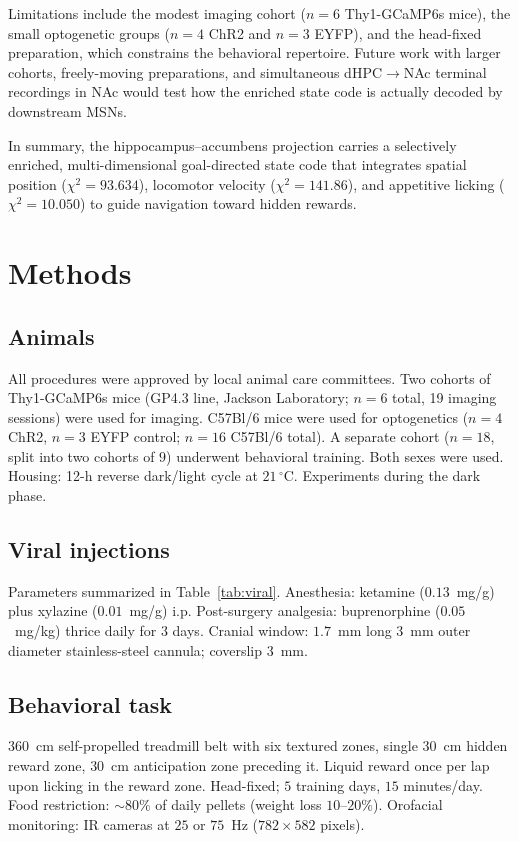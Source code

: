 \documentclass[11pt]{article}
\begin{document}
Limitations include the modest imaging cohort ($n=6$ Thy1-GCaMP6s mice), the small optogenetic groups ($n=4$ ChR2 and $n=3$ EYFP), and the head-fixed preparation, which constrains the behavioral repertoire. Future work with larger cohorts, freely-moving preparations, and simultaneous dHPC$\to$NAc terminal recordings in NAc would test how the enriched state code is actually decoded by downstream MSNs.

In summary, the hippocampus--accumbens projection carries a selectively enriched, multi-dimensional goal-directed state code that integrates spatial position ($\chi^2 = 93.634$), locomotor velocity ($\chi^2 = 141.86$), and appetitive licking ($\chi^2 = 10.050$) to guide navigation toward hidden rewards.

\section{Methods}

\subsection{Animals}
All procedures were approved by local animal care committees. Two cohorts of Thy1-GCaMP6s mice (GP4.3 line, Jackson Laboratory; $n=6$ total, 19 imaging sessions) were used for imaging. C57Bl/6 mice were used for optogenetics ($n=4$ ChR2, $n=3$ EYFP control; $n=16$ C57Bl/6 total). A separate cohort ($n=18$, split into two cohorts of $9$) underwent behavioral training. Both sexes were used. Housing: 12-h reverse dark/light cycle at $21\,^\circ$C. Experiments during the dark phase.

\subsection{Viral injections}
Parameters summarized in Table~\ref{tab:viral}. Anesthesia: ketamine ($0.13$~mg/g) plus xylazine ($0.01$~mg/g) i.p. Post-surgery analgesia: buprenorphine ($0.05$~mg/kg) thrice daily for 3 days. Cranial window: $1.7$~mm long $3$~mm outer diameter stainless-steel cannula; coverslip $3$~mm.

\subsection{Behavioral task}
$360$~cm self-propelled treadmill belt with six textured zones, single $30$~cm hidden reward zone, $30$~cm anticipation zone preceding it. Liquid reward once per lap upon licking in the reward zone. Head-fixed; $5$ training days, $15$ minutes/day. Food restriction: $\sim 80\%$ of daily pellets (weight loss $10$--$20\%$). Orofacial monitoring: IR cameras at $25$ or $75$~Hz ($782\times 582$ pixels).
\end{document}
